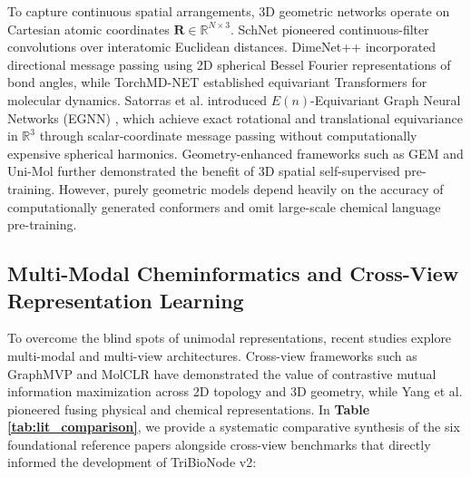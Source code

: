\documentclass[10pt,twocolumn]{article}
\begin{document}
To capture continuous spatial arrangements, 3D geometric networks operate on Cartesian atomic coordinates $\mathbf{R} \in \mathbb{R}^{N \times 3}$. SchNet \cite{schutt2018schnet} pioneered continuous-filter convolutions over interatomic Euclidean distances. DimeNet++ \cite{gasteiger2020directional} incorporated directional message passing using 2D spherical Bessel Fourier representations of bond angles, while TorchMD-NET \cite{tholke2022equivariant} established equivariant Transformers for molecular dynamics. Satorras et al. introduced $E(n)$-Equivariant Graph Neural Networks (EGNN) \cite{satorras2021en}, which achieve exact rotational and translational equivariance in $\mathbb{R}^3$ through scalar-coordinate message passing without computationally expensive spherical harmonics. Geometry-enhanced frameworks such as GEM \cite{fang2022geometry} and Uni-Mol \cite{zhou2023unimol} further demonstrated the benefit of 3D spatial self-supervised pre-training. However, purely geometric models depend heavily on the accuracy of computationally generated conformers and omit large-scale chemical language pre-training.

\subsection{Multi-Modal Cheminformatics and Cross-View Representation Learning}

To overcome the blind spots of unimodal representations, recent studies explore multi-modal and multi-view architectures. Cross-view frameworks such as GraphMVP \cite{liu2022pretraining} and MolCLR \cite{wang2022molecular} have demonstrated the value of contrastive mutual information maximization across 2D topology and 3D geometry, while Yang et al. \cite{yang2021deep} pioneered fusing physical and chemical representations. In \textbf{Table \ref{tab:lit_comparison}}, we provide a systematic comparative synthesis of the six foundational reference papers alongside cross-view benchmarks that directly informed the development of TriBioNode v2:
\end{document}
